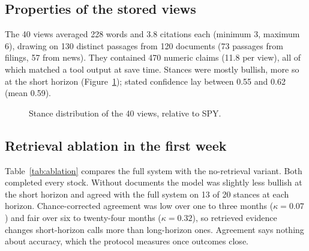 \documentclass[preprint,11pt]{elsarticle}
\begin{document}
\subsection{Properties of the stored views}

The 40 views averaged 228 words and 3.8 citations each (minimum 3, maximum 6), drawing on 130 distinct
passages from 120 documents (73 passages from filings, 57 from news). They contained 470 numeric claims
(11.8 per view), all of which matched a tool output at save time. Stances were mostly bullish, more so at the
short horizon (Figure~\ref{fig:stances}); stated confidence lay between 0.55 and 0.62 (mean 0.59).

\begin{figure}[t]
\centering
{}
\caption{Stance distribution of the 40 views, relative to SPY.}
\label{fig:stances}
\end{figure}

\subsection{Retrieval ablation in the first week}
\label{sec:ablation}

Table~\ref{tab:ablation} compares the full system with the no-retrieval variant. Both completed every
stock. Without documents the model was slightly less bullish at the short horizon and agreed with the full
system on 13 of 20 stances at each horizon. Chance-corrected agreement was low over one to three months
($\kappa = 0.07$) and fair over six to twenty-four months ($\kappa = 0.32$), so retrieved evidence changes
short-horizon calls more than long-horizon ones. Agreement says nothing about accuracy, which the protocol
measures once outcomes close.
\end{document}
